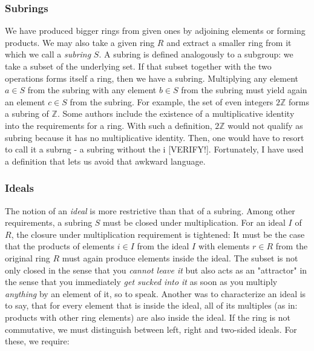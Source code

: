 \subsubsection{Subrings}
We have produced bigger rings from given ones by adjoining elements or forming products. We may also take a given ring $R$ and extract a smaller ring from it which we call a \emph{subring} $S$. A subring is defined analogously to a subgroup: we take a subset of the underlying set. If that subset together with the two operations forms itself a ring, then we have a subring. Multiplying any element $a \in S$ from the subring with any element $b \in S$ from the subring must yield again an element $c \in S$ from the subring. For example, the set of even integers $2 \mathbb{Z}$ forms a subring of $\mathbb{Z}$. Some authors include the existence of a multiplicative identity into the requirements for a ring. With such a definition, $2 \mathbb{Z}$ would not qualify as subring because it has no multiplicative identity. Then, one would have to resort to call it a subrng - a subring without the i [VERIFY!]. Fortunately, I have used a definition that lets us avoid that awkward language.


\subsubsection{Ideals}
The notion of an \emph{ideal} is more restrictive than that of a subring. Among other requirements, a subring $S$ must be closed under multiplication. For an ideal $I$ of $R$, the closure under multiplication requirement is tightened: It must be the case that the products of elements $i \in I$ from the ideal $I$ with elements $r \in R$ from the original ring $R$ must again produce elements inside the ideal. The subset is not only closed in the sense that you \emph{cannot leave it} but also acts as an "attractor" in the sense that you immediately \emph{get sucked into it} as soon as you multiply \emph{anything} by an element of it, so to speak. Another was to characterize an ideal is to say, that for every element that is inside the ideal, all of its multiples (as in: products with other ring elements) are also inside the ideal. If the ring is not commutative, we must distinguish between left, right and two-sided ideals. For these, we require:


